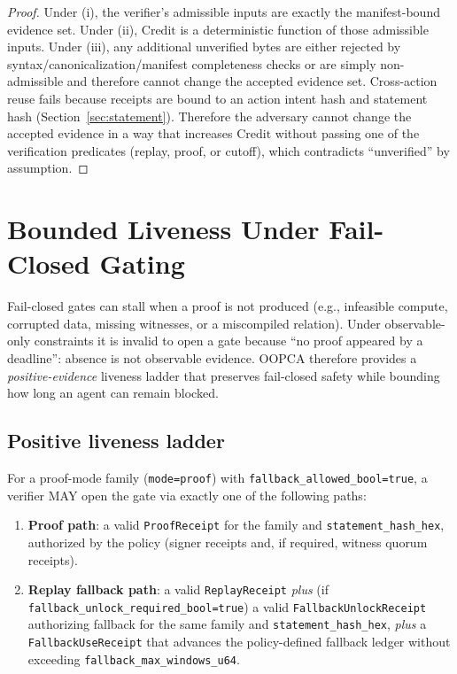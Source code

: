\documentclass[11pt]{article}
\begin{document}
\begin{proof}
Under (i), the verifier's admissible inputs are exactly the manifest-bound evidence set.
Under (ii), $\mathrm{Credit}$ is a deterministic function of those admissible inputs.
Under (iii), any additional unverified bytes are either rejected by syntax/canonicalization/manifest completeness checks or are simply non-admissible and therefore cannot change the accepted evidence set.
Cross-action reuse fails because receipts are bound to an action intent hash and statement hash (Section~\ref{sec:statement}).
Therefore the adversary cannot change the accepted evidence in a way that increases $\mathrm{Credit}$ without passing one of the verification predicates (replay, proof, or cutoff), which contradicts ``unverified'' by assumption.
\end{proof}

\section{Bounded Liveness Under Fail-Closed Gating}\label{sec:liveness}

Fail-closed gates can stall when a proof is not produced (e.g., infeasible compute, corrupted data, missing witnesses, or a miscompiled relation).
Under observable-only constraints it is invalid to open a gate because ``no proof appeared by a deadline'': absence is not observable evidence.
OOPCA therefore provides a \emph{positive-evidence} liveness ladder that preserves fail-closed safety while bounding how long an agent can remain blocked.

\subsection{Positive liveness ladder}

For a proof-mode family (\texttt{mode=proof}) with \texttt{fallback\_allowed\_bool=true}, a verifier MAY open the gate via exactly one of the following paths:

\begin{enumerate}
  \item \textbf{Proof path}: a valid \texttt{ProofReceipt} for the family and \texttt{statement\_hash\_hex}, authorized by the policy (signer receipts and, if required, witness quorum receipts).
  \item \textbf{Replay fallback path}: a valid \texttt{ReplayReceipt} \emph{plus} (if \texttt{fallback\_unlock\_required\_bool=true}) a valid \texttt{FallbackUnlockReceipt} authorizing fallback for the same family and \texttt{statement\_hash\_hex}, \emph{plus} a \texttt{FallbackUseReceipt} that advances the policy-defined fallback ledger without exceeding \texttt{fallback\_max\_windows\_u64}.
\end{enumerate}
\end{document}
